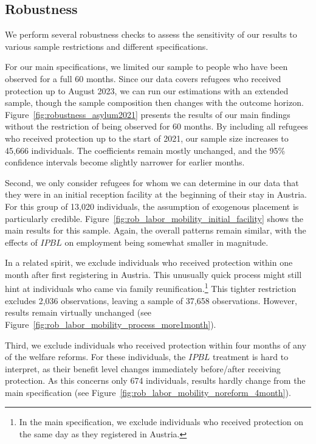\subsection{Robustness}\label{subsec:robustnessoob}
We perform several robustness checks to assess the sensitivity of our results to various sample restrictions and different specifications. 

For our main specifications, we limited our sample to people who have been observed for a full 60 months. Since our data covers refugees who received protection up to August 2023, we can run our estimations with an extended sample, though the sample composition then changes with the outcome horizon.
Figure~\ref{fig:robustness_asylum2021} presents the results of our main findings without the restriction of being observed for 60 months. By including all refugees who received protection up to the start of 2021, our sample size increases to 45,666 individuals. The coefficients remain mostly unchanged, and the 95\% confidence intervals become slightly narrower for earlier months.

Second, we only consider refugees for whom we can determine in our data that they were in an initial reception facility at the beginning of their stay in Austria. For this group of 13,020 individuals, the assumption of exogenous placement is particularly credible. Figure~\ref{fig:rob_labor_mobility_initial_facility} shows the main results for this sample. Again, the overall patterns remain similar, with the effects of $IPBL$ on employment being somewhat smaller in magnitude.

In a related spirit, we exclude individuals who received protection within one month after first registering in Austria. This unusually quick process might still hint at individuals who came via family reunification.\footnote{In the main specification, we exclude individuals who received protection on the same day as they registered in Austria.} This tighter restriction excludes 2,036 observations, leaving a sample of 37,658 observations. However, results remain virtually unchanged (see Figure~\ref{fig:rob_labor_mobility_process_more1month}).

Third, we exclude individuals who received protection within four months of any of the welfare reforms. For these individuals, the $IPBL$ treatment is hard to interpret, as their benefit level changes immediately before/after receiving protection. As this concerns only 674 individuals, results hardly change from the main specification (see Figure~\ref{fig:rob_labor_mobility_noreform_4month}).


